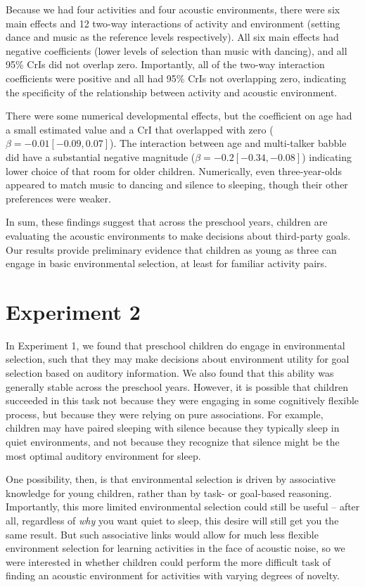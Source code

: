 \documentclass[10pt, letterpaper]{article}
\begin{document}
Because we had four activities and four acoustic environments, there
were six main effects and 12 two-way interactions of activity and
environment (setting dance and music as the reference levels
respectively). All six main effects had negative coefficients (lower
levels of selection than music with dancing), and all 95\% CrIs did not
overlap zero. Importantly, all of the two-way interaction coefficients
were positive and all had 95\% CrIs not overlapping zero, indicating the
specificity of the relationship between activity and acoustic
environment.

There were some numerical developmental effects, but the coefficient on
age had a small estimated value and a CrI that overlapped with zero
(\(\beta = -0.01 [-0.09, 0.07]\)). The interaction between age and
multi-talker babble did have a substantial negative magnitude
(\(\beta = -0.2 [-0.34,-0.08]\)) indicating lower choice of that room
for older children. Numerically, even three-year-olds appeared to match
music to dancing and silence to sleeping, though their other preferences
were weaker.

In sum, these findings suggest that across the preschool years, children
are evaluating the acoustic environments to make decisions about
third-party goals. Our results provide preliminary evidence that
children as young as three can engage in basic environmental selection,
at least for familiar activity pairs.

\hypertarget{experiment-2}{%
\section{Experiment 2}\label{experiment-2}}

In Experiment 1, we found that preschool children do engage in
environmental selection, such that they may make decisions about
environment utility for goal selection based on auditory information. We
also found that this ability was generally stable across the preschool
years. However, it is possible that children succeeded in this task not
because they were engaging in some cognitively flexible process, but
because they were relying on pure associations. For example, children
may have paired sleeping with silence because they typically sleep in
quiet environments, and not because they recognize that silence might be
the most optimal auditory environment for sleep.

One possibility, then, is that environmental selection is driven by
associative knowledge for young children, rather than by task- or
goal-based reasoning. Importantly, this more limited environmental
selection could still be useful -- after all, regardless of \emph{why}
you want quiet to sleep, this desire will still get you the same result.
But such associative links would allow for much less flexible
environment selection for learning activities in the face of acoustic
noise, so we were interested in whether children could perform the more
difficult task of finding an acoustic environment for activities with
varying degrees of novelty.
\end{document}
